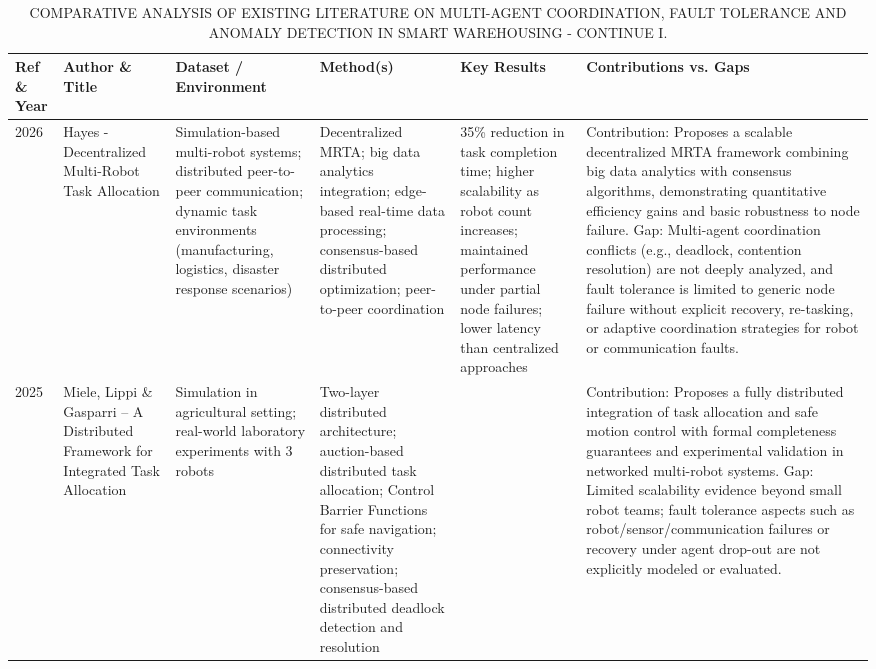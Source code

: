 \documentclass[conference]{IEEEtran}
\begin{document}
\begin{table}[!t]
\centering
\footnotesize
\setlength{\tabcolsep}{4pt}
\renewcommand{\arraystretch}{1.05}
\caption{COMPARATIVE ANALYSIS OF EXISTING LITERATURE ON MULTI-AGENT COORDINATION, FAULT TOLERANCE AND ANOMALY DETECTION IN SMART WAREHOUSING - CONTINUE I.}
\label{LitRevTable_2}
\begin{tabularx}{\linewidth}{@{}L{0.7cm}L{2.0cm}L{2.0cm}L{3.6cm}L{3.8cm}Y@{}}
\toprule
\textbf{Ref \& Year} &
  \textbf{Author \& Title} &
  \textbf{Dataset / Environment} &
  \textbf{Method(s)} &
  \textbf{Key Results} &
  \textbf{Contributions vs. Gaps}  \\ \midrule
\cite{hayes2026decentralized} 2026 & Hayes - Decentralized Multi-Robot Task Allocation & Simulation-based multi-robot systems; distributed peer-to-peer communication; dynamic task environments (manufacturing, logistics, disaster response scenarios) & Decentralized MRTA; big data analytics integration; edge-based real-time data processing; consensus-based distributed optimization; peer-to-peer coordination & 35\% reduction in task completion time; higher scalability as robot count increases; maintained performance under partial node failures; lower latency than centralized approaches & Contribution: Proposes a scalable decentralized MRTA framework combining big data analytics with consensus algorithms, demonstrating quantitative efficiency gains and basic robustness to node failure. \newline Gap: Multi-agent coordination conflicts (e.g., deadlock, contention resolution) are not deeply analyzed, and fault tolerance is limited to generic node failure without explicit recovery, re-tasking, or adaptive coordination strategies for robot or communication faults. \\ \midrule
\cite{miele2025distributed} 2025 & Miele, Lippi \& Gasparri -- A Distributed Framework for Integrated Task Allocation & Simulation in agricultural setting; real-world laboratory experiments with 3 robots & Two-layer distributed architecture; auction-based distributed task allocation; Control Barrier Functions for safe navigation; connectivity preservation; consensus-based distributed deadlock detection and resolution &  & Contribution: Proposes a fully distributed integration of task allocation and safe motion control with formal completeness guarantees and experimental validation in networked multi-robot systems. \newline Gap: Limited scalability evidence beyond small robot teams; fault tolerance aspects such as robot/sensor/communication failures or recovery under agent drop-out are not explicitly modeled or evaluated.\\ \midrule

\end{tabularx}
\end{table}
\end{document}
